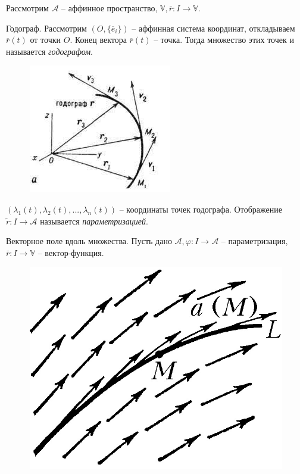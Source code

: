 \begin{Rem}
	Рассмотрим $\mathcal{A}$ -- аффинное пространство, $\mathbb{V}, \overline{r} : I \to \mathbb{V}$.

	\begin{MyList}
		\item Годограф. Рассмотрим $(O, \{\overline{e}_i\})$ -- аффинная система координат, откладываем $\overline{r}(t)$ от точки $O$.
		Конец вектора $\overline{r}(t)$ -- точка. Тогда множество этих точек и называется \textit{годографом}.

		\begin{figure}[H]
			\centering
			\includegraphics{img/Hodograph.jpg}
		\end{figure}

		$(\lambda_1(t), \lambda_2(t), ..., \lambda_n(t))$ -- координаты точек годографа.
		Отображение $\widetilde{r} : I \to \mathcal{A}$ называется \textit{параметризацией}.

		\item Векторное поле вдоль множества. Пусть дано $\mathcal{A}, \varphi : I \to \mathcal{A}$ -- параметризация, $\overline{r} : I \to \mathbb{V}$ -- вектор-функция.
		
		\begin{figure}[H]
			\centering
			\includegraphics{img/vector_field.jpg}
		\end{figure}
	\end{MyList}
\end{Rem}


